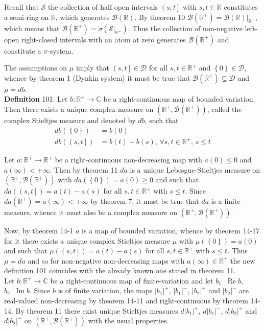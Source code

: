 \documentclass[a4paper]{article}
\newcommand{\obj}[1]{\left\{ #1 \right \}}
\newcommand{\ploc}[1]{\left ( #1 \right ]}
\newcommand{\brac}[1]{\left ( #1 \right )}
\newcommand{\induc}[1]{\left . #1 \right \vert}
\newcommand{\abs}[1]{\left | #1 \right |}
\newcommand{\Real}{\mathbb{R}}
\newcommand{\Cplx}{\mathbb{C}}
\newcommand{\Dcal}{\mathcal{D}}
\newcommand{\Scal}{\mathcal{S}}
\newcommand{\borel}[1]{\mathcal{B}\brac{#1}}
\newcommand{\defn}{\mathop{\overset{\Delta}{=}}\nolimits}
\newcommand{\re}{\operatorname{Re}\nolimits}
\newcommand{\im}{\operatorname{Im}\nolimits}
\begin{document}
Recall that $\Scal$ the collection of half open intervals $\ploc{s,t}$ with $s,t\in \Real$ constitutes a semi-ring on $\Real$, which generates $\borel{\Real}$. By theorem 10 $\borel{\Real^+} = \induc{\borel{\Real}}_{\Real^+}$, which means that $\borel{\Real^+}=\sigma\brac{\induc{\Scal}_{\Real^+}}$. Thus the collection of non-negative left-open right-closed intervals with an atom at zero generates $\borel{\Real^+}$ and constitute a $\pi$-system.

The assumptions on $\mu$ imply that $\ploc{s,t}\in\Dcal$ for all $s,t\in \Real^+$ and $\obj{0}\in\Dcal$, whence by theorem 1 (Dynkin system) it must be true that $\borel{\Real^+}\subseteq \Dcal$ and $\mu=db$.\\

\noindent\textbf{Definition} 101.
Let $b:\Real^+\to\Cplx$ be a right-continuous map of bounded variation. Then there exists a unique complex measure on $\brac{\Real^+,\borel{\Real^+}}$, called the complex Stieltjes measure and denoted by $db$, such that\begin{align*}db\brac{\obj{0}}&=b\brac{0}\\db\brac{\ploc{s,t}}&=b\brac{t}-b\brac{s},\,\forall s,t\in \Real^+,\,s\leq t\end{align*}

Let $a:\Real^+\to \Real^+$ be a right-continuous non-decreasing map with $a\brac{0}\leq 0$ and $a\brac{\infty}<+\infty$. Then by theorem 11 $da$ is a unique Lebesgue-Stieltjes measure on $\brac{\Real^+, \borel{\Real^+}}$ with $da\brac{\obj{0}} = a\brac{0}\geq 0$ and such that $da\brac{\ploc{s,t}}=a\brac{t}-a\brac{s}$ for all $s,t\in \Real^+$ with $s\leq t$. Since $da\brac{\Real^+} = a\brac{\infty}<+\infty$ by theorem 7, it must be true that $da$ is a finite measure, whence it must also be a complex measure on $\brac{\Real^+, \borel{\Real^+}}$.

Now, by theorem 14-1 $a$ is a map of bounded variation, whence by theorem 14-17 for it there exists a unique complex Stieltjes measure $\mu$ with $\mu\brac{\obj{0}} = a\brac{0}$ and such that $\mu\brac{\ploc{s,t}}=a\brac{t}-a\brac{s}$ for all $s,t\in \Real^+$ with $s\leq t$. Thus $\mu=da$ and so for non-negative non-decreasing maps with $a\brac{\infty}\in \Real^+$ the new definition 101 coincides with the already known one stated in theorem 11.\\

Let $b:\Real^+\to \Cplx$ be a right-continuous map of finite-variation and let $b_1\defn\re b$, $b_2\defn \im b$. Since $b$ is of finite variation, the maps $\abs{b_1}^+$, $\abs{b_1}^-$, $\abs{b_2}^+$ and $\abs{b_2}^-$ are real-valued non-decreasing by theorem 14-11 and right-continuous by theorem 14-14. By theorem 11 there exist unique Stieltjes measures $d\abs{b_1}^+$, $d\abs{b_1}^-$, $d\abs{b_2}^+$ and $d\abs{b_2}^-$ on $\brac{\Real^+, \borel{\Real^+}}$ with the usual properties.
\end{document}
